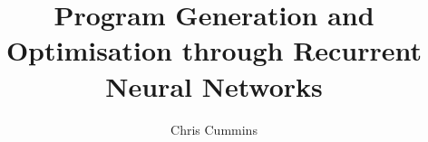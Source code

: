 

\title{Program Generation and Optimisation through Recurrent Neural Networks}
\author{Chris Cummins}

\abstract{}

%

\newif\ifstapled


  
  
  
  
  
  
  
  
  

